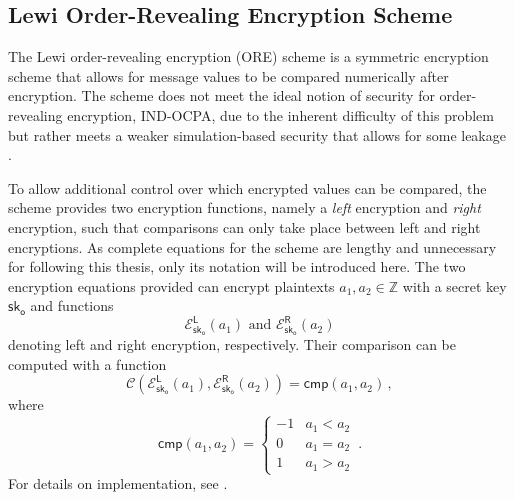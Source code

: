 % 
% 

\subsection{Lewi Order-Revealing Encryption Scheme}\label{subsec:prelims:lewi_ore}
The Lewi order-revealing encryption (ORE) scheme is a symmetric encryption scheme that allows for message values to be compared numerically after encryption. The scheme does not meet the ideal notion of security for order-revealing encryption, IND-OCPA, due to the inherent difficulty of this problem but rather meets a weaker simulation-based security that allows for some leakage \cite{chenettePracticalOrderRevealingEncryption2016}.

To allow additional control over which encrypted values can be compared, the scheme provides two encryption functions, namely a \textit{left} encryption and \textit{right} encryption, such that comparisons can only take place between left and right encryptions. As complete equations for the scheme are lengthy and unnecessary for following this thesis, only its notation will be introduced here. The two encryption equations provided can encrypt plaintexts $a_1,a_2\in\mathbb{Z}$ with a secret key $\mathsf{sk}_{\mathsf{o}}$ and functions
\begin{equation}\label{eq:prelims:lewi_enc}
    \mathcal{E}^{\mathsf{L}}_{\mathsf{sk}_{\mathsf{o}}}\left(a_1\right)\text{ and }\mathcal{E}^{\mathsf{R}}_{\mathsf{sk}_{\mathsf{o}}}\left(a_2\right)
\end{equation}
denoting left and right encryption, respectively. Their comparison can be computed with a function
\begin{equation}\label{eq:prelims:lewi_comp}
    \mathcal{C}\left(\mathcal{E}^{\mathsf{L}}_{\mathsf{sk}_{\mathsf{o}}}(a_1), \mathcal{E}^{\mathsf{R}}_{\mathsf{sk}_{\mathsf{o}}}(a_2)\right) = \mathsf{cmp}(a_1, a_2)\,,
\end{equation}
where
\begin{equation}
    \mathsf{cmp}(a_1, a_2)=
    \begin{cases}
        -1 & a_1 < a_2\\
        0 & a_1 = a_2\\
        1 & a_1 > a_2
    \end{cases}\,.
\end{equation}
For details on implementation, see \cite{lewiOrderRevealingEncryptionNew2016}.

